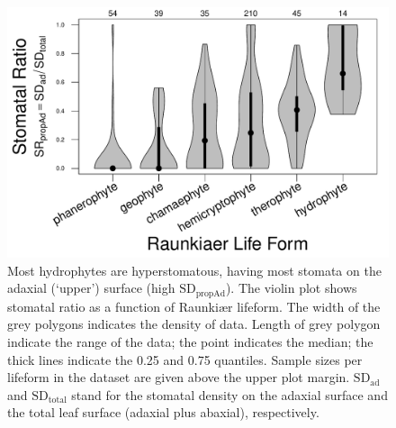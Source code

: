 \documentclass[12pt, oneside]{article}
\begin{document}
\begin{figure}[ht]
\centerline{\includegraphics{Figures/FigureS_violin.pdf}}
\caption{Most hydrophytes are hyperstomatous, having most stomata on the adaxial (`upper') surface (high $\mathrm{SD_{propAd}}$). The violin plot shows stomatal ratio as a function of Raunki\ae r lifeform. The width of the grey polygons indicates the density of data. Length of grey polygon indicate the range of the data; the point indicates the median; the thick lines indicate the 0.25 and 0.75 quantiles. Sample sizes per lifeform in the dataset are given above the upper plot margin. $\mathrm{SD_{ad}}$ and $\mathrm{SD_{total}}$ stand for the stomatal density on the adaxial surface and the total leaf surface (adaxial plus abaxial), respectively.}
\label{fig:violin}
\end{figure}
\end{document}
